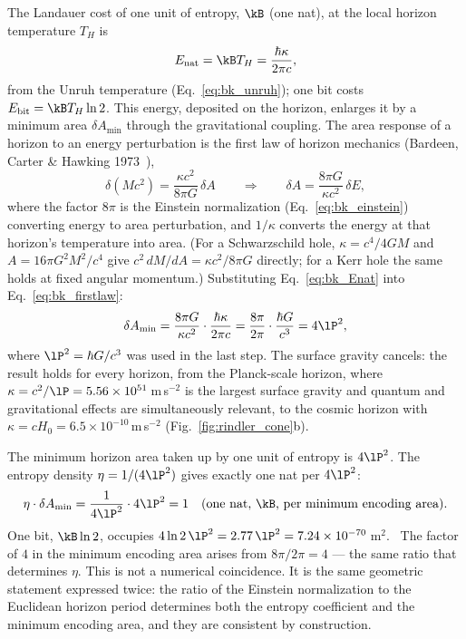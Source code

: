 The Landauer cost of one unit of entropy, $\kB$ (one nat), at the local horizon temperature $T_H$ is
\begin{equation}
E_{\rm nat}=\kB T_H=\frac{\hbar\kappa}{2\pi c},\label{eq:bk_Enat}
\end{equation}
from the Unruh temperature (Eq.~\eqref{eq:bk_unruh}); one bit costs $E_{\rm bit}=\kB T_H\ln2$. This energy, deposited on the horizon, enlarges it by a minimum
area $\delta A_{\min}$ through the gravitational coupling. The area response of a horizon to an energy perturbation is the first law of horizon mechanics
(Bardeen, Carter \& Hawking 1973~\cite{BardeenCarterHawking1973}),
\begin{equation}
\delta(Mc^2)=\frac{\kappa c^2}{8\pi G}\,\delta A\qquad\Longrightarrow\qquad\delta A=\frac{8\pi G}{\kappa c^2}\,\delta E ,\label{eq:bk_firstlaw}
\end{equation}
where the factor $8\pi$ is the Einstein normalization (Eq.~\eqref{eq:bk_einstein}) converting energy to area perturbation, and $1/\kappa$ converts the energy at that
horizon's temperature into area. (For a Schwarzschild hole, $\kappa=c^4/4GM$ and $A=16\pi G^2M^2/c^4$ give $c^2\,dM/dA=\kappa c^2/8\pi G$ directly; for a Kerr
hole the same holds at fixed angular momentum.) Substituting Eq.~\eqref{eq:bk_Enat} into Eq.~\eqref{eq:bk_firstlaw}:
\begin{equation}
\delta A_{\min}=\frac{8\pi G}{\kappa c^2}\cdot\frac{\hbar\kappa}{2\pi c}=\frac{8\pi}{2\pi}\cdot\frac{\hbar G}{c^3}=4\lP^2 ,\label{eq:bk_dAmin}
\end{equation}
where $\lP^2=\hbar G/c^3$ was used in the last step. The surface gravity cancels: the result holds for every horizon, from the Planck-scale horizon, where
$\kappa=c^2/\lP=5.56\times10^{51}$\,m\,s$^{-2}$ is the largest surface gravity and quantum and gravitational effects are simultaneously relevant, to the cosmic
horizon with $\kappa=cH_0=6.5\times10^{-10}$\,m\,s$^{-2}$ (Fig.~\ref{fig:rindler_cone}b). \derived

The minimum horizon area taken up by one unit of entropy is $4\lP^2$. The entropy density $\eta=1/(4\lP^2)$ gives exactly one nat per $4\lP^2$:
\begin{equation}
\eta\cdot\delta A_{\min}=\frac{1}{4\lP^2}\cdot4\lP^2=1\quad\text{(one nat, $\kB$, per minimum encoding area)}.\label{eq:bk_onenat}
\end{equation}
One bit, $\kB\ln2$, occupies $4\ln2\,\lP^2=2.77\,\lP^2=7.24\times10^{-70}$\,m$^2$. \calc\ The factor of $4$ in the minimum encoding area arises from $8\pi/2\pi=4$ ---
the same ratio that determines $\eta$. This is not a numerical coincidence. It is the same geometric statement expressed twice: the ratio of the Einstein
normalization to the Euclidean horizon period determines both the entropy coefficient and the minimum encoding area, and they are consistent by
construction.

